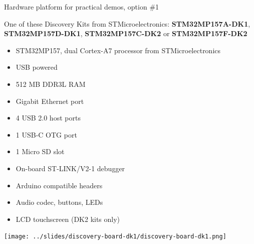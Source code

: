 \documentclass[a4paper,12pt,obeyspaces,spaces,hyphens]{article}
\begin{document}
\feshowtitle

\onlinepedagogics
{}
\certificate{}
\disabilities{}

\feagendatwocolumn
{Hardware platform for practical demos, option \#1}
{
  One of these Discovery Kits from STMicroelectronics: {\bf
  STM32MP157A-DK1}, {\bf STM32MP157D-DK1}, {\bf STM32MP157C-DK2} or
  {\bf STM32MP157F-DK2}
  \begin{itemize}
  \item STM32MP157, dual Cortex-A7 processor from STMicroelectronics
  \item USB powered
  \item 512 MB DDR3L RAM
  \item Gigabit Ethernet port
  \item 4 USB 2.0 host ports
  \item 1 USB-C OTG port
  \item 1 Micro SD slot
  \item On-board ST-LINK/V2-1 debugger
  \item Arduino compatible headers
  \item Audio codec, buttons, LEDs
  \item LCD touchscreen (DK2 kits only)
  \end{itemize}
}
{}
{
  \begin{center}
    \texttt{[image: ../slides/discovery-board-dk1/discovery-board-dk1.png]}
  \end{center}
}
\end{document}
